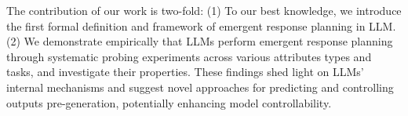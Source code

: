 The contribution of our work is two-fold: 
(1) To our best knowledge, we introduce the first formal definition and framework of emergent response planning in LLM.
(2) We demonstrate empirically that LLMs perform emergent response planning through systematic probing experiments across various attributes types and tasks, and investigate their properties.
These findings shed light on LLMs' internal mechanisms and suggest novel approaches for predicting and controlling outputs pre-generation, potentially enhancing model controllability.




